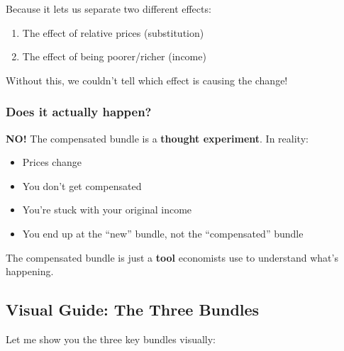 \documentclass[11pt]{article}
\begin{document}
Because it lets us separate two different effects:
\begin{enumerate}
    \item The effect of relative prices (substitution)
    \item The effect of being poorer/richer (income)
\end{enumerate}

Without this, we couldn't tell which effect is causing the change!

\subsubsection{Does it actually happen?}

\textbf{NO!} The compensated bundle is a \textbf{thought experiment}. In reality:
\begin{itemize}
    \item Prices change
    \item You don't get compensated
    \item You're stuck with your original income
    \item You end up at the ``new'' bundle, not the ``compensated'' bundle
\end{itemize}

The compensated bundle is just a \textbf{tool} economists use to understand what's happening.

\newpage

\subsection{Visual Guide: The Three Bundles}

Let me show you the three key bundles visually:
\end{document}
